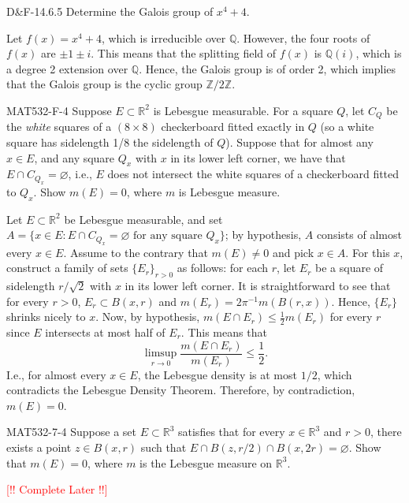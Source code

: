 \documentclass{article}
\begin{document}
\begin{prb}{D\&F-14.6.5}
	Determine the Galois group of $x^{4} + 4$. 
\end{prb}
\begin{solutions}
	Let $f(x) = x^{4} + 4$, which is irreducible over $\mathbb{Q}$. However, the four roots of $f(x)$ are $\pm 1 \pm i$. This means that the splitting field of $f(x)$ is $\mathbb{Q}(i)$, which is a degree 2 extension over $\mathbb{Q}$. Hence, the Galois group is of order 2, which implies that the Galois group is the cyclic group $\mathbb{Z}/2\mathbb{Z}$. 
\end{solutions}
\begin{prb}{MAT532-F-4}
	Suppose $E \subset \mathbb{R}^{2}$ is Lebesgue measurable. For a square $Q$, let $C_{Q}$ be the \textit{white} squares of a $(8 \times 8)$ checkerboard fitted exactly in $Q$ (so a white square has sidelength 1/8 the sidelength of $Q$). Suppose that for almost any $x \in E$, and any square $Q_{x}$ with $x$ in its lower left corner, we have that $E \cap C_{Q_{x}} = \varnothing$, i.e., $E$ does not intersect the white squares of a checkerboard fitted to $Q_{x}$. Show $m(E) = 0$, where $m$ is Lebesgue measure. 
\end{prb}
\begin{solutions}
	Let $E \subset \mathbb{R}^{2}$ be Lebesgue measurable, and set $A = \{x \in E: E \cap C_{Q_{x}} = \varnothing \text{ for any square $Q_{x}$}\}$; by hypothesis, $A$ consists of almost every $x \in E$. Assume to the contrary that $m(E) \neq 0$ and pick $x \in A$. For this $x$, construct a family of sets $\{E_{r}\}_{r > 0}$ as follows: for each $r$, let $E_{r}$ be a square of sidelength $r/\sqrt{2}$ with $x$ in its lower left corner. It is straightforward to see that for every $r > 0$, $E_{r} \subset B(x, r)$ and $m(E_{r}) = 2\pi^{-1}m(B(r, x))$. Hence, $\{E_{r}\}$ shrinks nicely to $x$. Now, by hypothesis, $m(E \cap E_{r}) \leq \frac{1}{2}m(E_{r})$ for every $r$ since $E$ intersects at most half of $E_{r}$. This means that 
	\begin{equation}
		\limsup_{r \to 0}\frac{m(E \cap E_{r})}{m(E_{r})} \leq \frac{1}{2}. 
	\end{equation}
	I.e., for almost every $x \in E$, the Lebesgue density is at most $1/2$, which contradicts the Lebesgue Density Theorem. Therefore, by contradiction, $m(E) = 0$. 
\end{solutions}
\begin{prb}{MAT532-7-4}
	Suppose a set $E \subset \mathbb{R}^{3}$ satisfies that for every $x \in\mathbb{R}^{3}$ and $r > 0$, there exists a point $z \in B(x, r)$ such that $E \cap B(z, r/2) \cap B(x, 2r) = \varnothing$. Show that $m(E) = 0$, where $m$ is the Lebesgue measure on $\mathbb{R}^{3}$. 
\end{prb}
\textcolor{red}{[!! Complete Later !!]}
\end{document}
